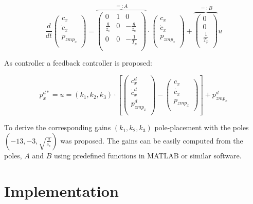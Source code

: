 \documentclass[english,ngerman]{KITreprt}
\newcommand{\name}[1]{\textsc{#1}}
\begin{document}
\begin{equation} \label{eq:dyn-system-adaption}
\frac{d}{dt} \left(\begin{array}{c}
c_x \\
\dot{c}_x \\
p_{zmp_x} \\
\end{array} \right)
=
\overbrace{
\left(\begin{array}{ccc}
0 & 1 & 0\\
\frac{g}{z_c} & 0 & -\frac{g}{z_c} \\
0 & 0 & -\frac{1}{T_p} \\
\end{array}\right)
}^{ =: A}
\cdot
\left(\begin{array}{c}
c_x \\
\dot{c}_x \\
p_{zmp_x} \\
\end{array}\right)
+
\overbrace{
\left(\begin{array}{c}
0 \\
0 \\
\frac{1}{T_p} \\
\end{array}\right)
}^{ =: B}
u
\end{equation}

As controller a feedback controller is proposed:

\begin{equation}
p^{d*}_x = u = (k_1, k_2, k_3) \cdot
\left[
\left(\begin{array}{c}
c^d_x \\
\dot{c}^d_x \\
p^d_{zmp_x} \\
\end{array}\right)
-
\left(\begin{array}{c}
c_x \\
\dot{c_x} \\
p_{zmp_x} \\
\end{array}\right)
\right]
+ p^d_{zmp_x}
\end{equation}

To derive the corresponding gains $(k_1, k_2, k_3)$ pole-placement with
the poles $(-13, -3, \sqrt{\frac{g}{c_z}})$ was proposed. The gains can
be easily computed from the poles, $A$ and $B$ using predefined
functions in \name{MATLAB} or similar software.

\section{Implementation}\label{implementation-1}
\end{document}
